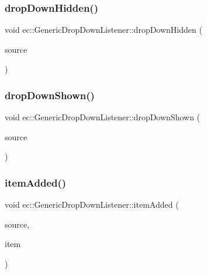 \subsubsection{\texorpdfstring{drop\+Down\+Hidden()}{dropDownHidden()}}
{\footnotesize\ttfamily void ec\+::\+Generic\+Drop\+Down\+Listener\+::drop\+Down\+Hidden (\begin{DoxyParamCaption}\item[{agui\+::\+Drop\+Down $\ast$}]{source }\end{DoxyParamCaption})\hspace{0.3cm}{\ttfamily [override]}}

\mbox{\label{classec_1_1_generic_drop_down_listener_a23e0a88ebbf1a012d9e2c7619785cde8}} 
\subsubsection{\texorpdfstring{drop\+Down\+Shown()}{dropDownShown()}}
{\footnotesize\ttfamily void ec\+::\+Generic\+Drop\+Down\+Listener\+::drop\+Down\+Shown (\begin{DoxyParamCaption}\item[{agui\+::\+Drop\+Down $\ast$}]{source }\end{DoxyParamCaption})\hspace{0.3cm}{\ttfamily [override]}}

\mbox{\label{classec_1_1_generic_drop_down_listener_a33748da34ef4c229a31cafc4c3cb8c79}} 
\subsubsection{\texorpdfstring{item\+Added()}{itemAdded()}}
{\footnotesize\ttfamily void ec\+::\+Generic\+Drop\+Down\+Listener\+::item\+Added (\begin{DoxyParamCaption}\item[{agui\+::\+Drop\+Down $\ast$}]{source,  }\item[{const std\+::string \&}]{item }\end{DoxyParamCaption})\hspace{0.3cm}{\ttfamily [override]}}

